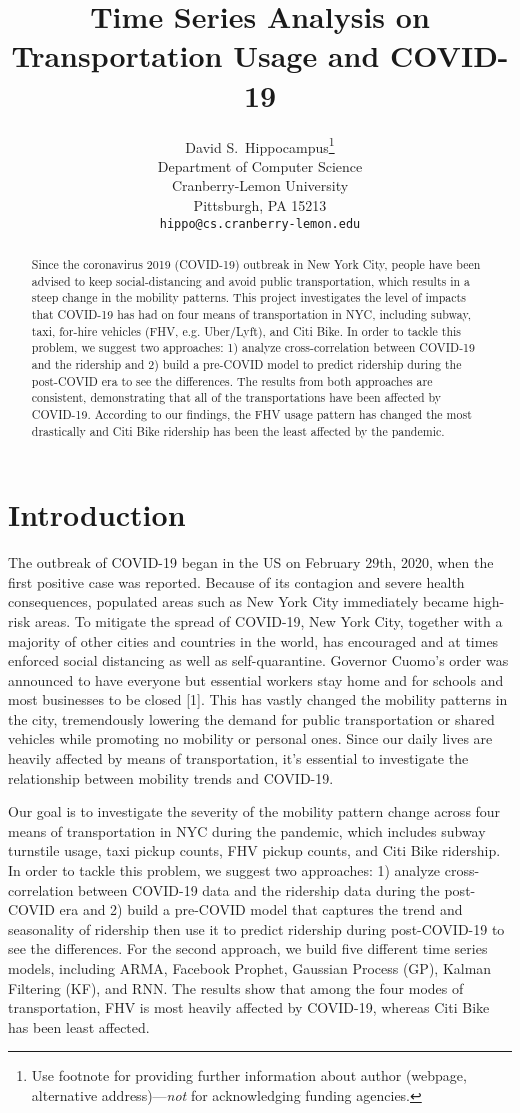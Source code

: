 \documentclass{article}
\title{Time Series Analysis on\\
Transportation Usage and COVID-19
}
\author{%
  David S.~Hippocampus\thanks{Use footnote for providing further information
    about author (webpage, alternative address)---\emph{not} for acknowledging
    funding agencies.} \\
  Department of Computer Science\\
  Cranberry-Lemon University\\
  Pittsburgh, PA 15213 \\
  \texttt{hippo@cs.cranberry-lemon.edu} \\
}
\begin{document}
\maketitle

\begin{abstract}
  Since the coronavirus 2019 (COVID-19) outbreak in New York City, people have been advised to keep social-distancing and avoid public transportation, which results in a steep change in the mobility patterns. This project investigates the level of impacts that COVID-19 has had on four means of transportation in NYC, including subway, taxi, for-hire vehicles (FHV, e.g. Uber/Lyft), and Citi Bike. In order to tackle this problem, we suggest two approaches: 1) analyze cross-correlation between COVID-19 and the ridership and 2) build a pre-COVID model to predict ridership during the post-COVID era to see the differences. The results from both approaches are consistent, demonstrating that all of the transportations have been affected by COVID-19. According to our findings, the FHV usage pattern has changed the most drastically and Citi Bike ridership has been the least affected by the pandemic.
\end{abstract}

\section{Introduction}
The outbreak of COVID-19 began in the US on February 29th, 2020, when the first positive case was reported. Because of its contagion and severe health consequences, populated areas such as New York City immediately became high-risk areas. To mitigate the spread of COVID-19, New York City, together with a majority of other cities and countries in the world, has encouraged and at times enforced social distancing as well as self-quarantine. Governor Cuomo’s order was announced to have everyone but essential workers stay home and for schools and most businesses to be closed [1]. This has vastly changed the mobility patterns in the city, tremendously lowering the demand for public transportation or shared vehicles while promoting no mobility or personal ones. Since our daily lives are heavily affected by means of transportation, it’s essential to investigate the relationship between mobility trends and COVID-19. 

Our goal is to investigate the severity of the mobility pattern change across four means of transportation in NYC during the pandemic, which includes subway turnstile usage, taxi pickup counts, FHV pickup counts, and Citi Bike ridership. In order to tackle this problem, we suggest two approaches: 1) analyze cross-correlation between COVID-19 data and the ridership data during the post-COVID era and 2) build a pre-COVID model that captures the trend and seasonality of ridership then use it to predict ridership during post-COVID-19 to see the differences. For the second approach, we build five different time series models, including ARMA, Facebook Prophet, Gaussian Process (GP), Kalman Filtering (KF), and RNN. The results show that among the four modes of transportation, FHV is most heavily affected by COVID-19, whereas Citi Bike has been least affected.
\end{document}
